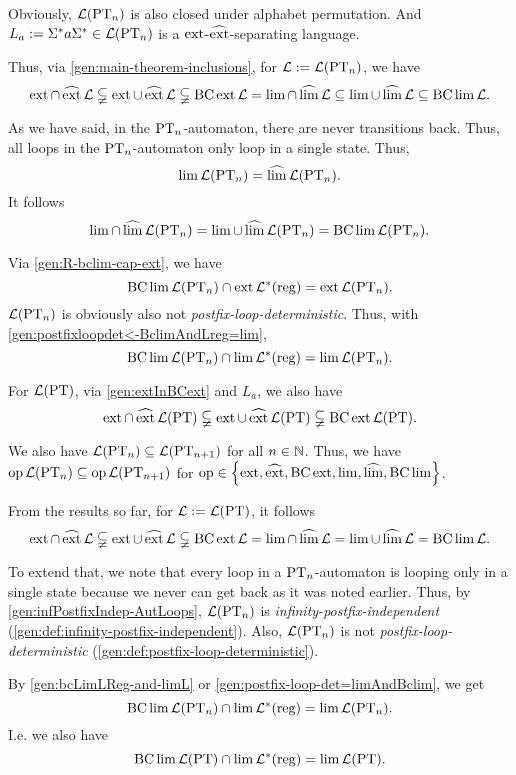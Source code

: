 Obviously, $\Lang(\PT_n)$ is also closed under alphabet permutation. And $L_a := \Sigma^* a \Sigma^* \in \Lang(\PT_n)$ is a $\ext$-$\dext$-separating language.

Thus, via \cref{gen:main-theorem-inclusions}, for $\Lang := \Lang(\PT_n)$, we have
\[ \ext \cap \dext \Lang \subsetneqq
\ext \cup \dext \Lang \subsetneqq
\BC \ext \Lang =
\lim \cap \dlim \Lang \subseteq
\lim \cup \dlim \Lang \subseteq
\BC \lim \Lang . \]

As we have said, in the $\PT_n$-automaton, there are never transitions back. Thus, all loops in the $\PT_n$-automaton only loop in a single state. Thus,
\[ \lim \Lang(\PT_n) = \dlim \Lang(\PT_n) . \]
It follows
\[ \lim \cap \dlim \Lang(\PT_n) =
\lim \cup \dlim \Lang(\PT_n) =
\BC \lim \Lang(\PT_n) . \]

Via \cref{gen:R-bclim-cap-ext}, we have
\[ \BC \lim \Lang(\PT_n) \cap \ext \Langreg = \ext \Lang(\PT_n) . \]
$\Lang(\PT_n)$ is obviously also not \emph{postfix-loop-deterministic}. Thus, with \cref{gen:postfixloopdet<-BclimAndLreg=lim},
\[ \BC \lim \Lang(\PT_n) \cap \lim \Langreg = \lim \Lang(\PT_n) . \]

For $\Lang(\PT)$, via \cref{gen:extInBCext} and $L_a$, we also have
\[ \ext \cap \dext \Lang(\PT) \subsetneqq
\ext \cup \dext \Lang(\PT) \subsetneqq
\BC \ext \Lang(\PT) . \]

We also have $\Lang(\PT_n) \subseteq \Lang(\PT_{n+1})$ for all $n \in \N$. Thus, we have $\operatorname{op} \Lang(\PT_n) \subseteq \operatorname{op} \Lang(\PT_{n+1})$ for $\operatorname{op} \in \Set{\ext, \dext, \BC \ext, \lim,\dlim,\BC \lim}$.

From the results so far, for $\Lang := \Lang(\PT)$, it follows
\[ \ext \cap \dext \Lang \subsetneqq
\ext \cup \dext \Lang \subsetneqq
\BC \ext \Lang =
\lim \cap \dlim \Lang =
\lim \cup \dlim \Lang =
\BC \lim \Lang . \]

To extend that, we note that every loop in a $\PT_n$-automaton is looping only in a single state because we never can get back as it was noted earlier. Thus, by \cref{gen:infPostfixIndep-AutLoops}, $\Lang(\PT_n)$ is \emph{infinity-postfix-independent} (\cref{gen:def:infinity-postfix-independent}). Also, $\Lang(\PT_n)$ is not \emph{postfix-loop-deterministic} (\cref{gen:def:postfix-loop-deterministic}).

By \cref{gen:bcLimLReg-and-limL} or \cref{gen:postfix-loop-det=limAndBclim}, we get
\[ \BC \lim \Lang(\PT_n) \cap \lim \Langreg = \lim \Lang(\PT_n) . \]
I.e. we also have
\[ \BC \lim \Lang(\PT) \cap \lim \Langreg = \lim \Lang(\PT) . \]

